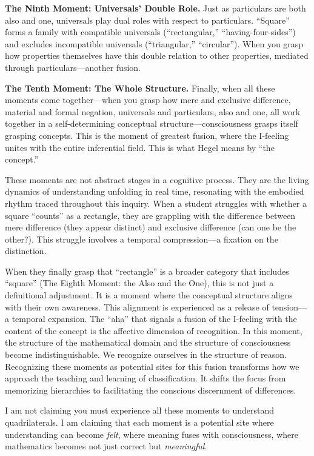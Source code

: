 \documentclass[12pt]{book}
\begin{document}
\textbf{The Ninth Moment: Universals' Double Role.} Just as particulars are both also and one, universals play dual roles with respect to particulars. ``Square'' forms a family with compatible universals (``rectangular,'' ``having-four-sides'') and excludes incompatible universals (``triangular,'' ``circular''). When you grasp how properties themselves have this double relation to other properties, mediated through particulars---another fusion.

\textbf{The Tenth Moment: The Whole Structure.} Finally, when all these moments come together---when you grasp how mere and exclusive difference, material and formal negation, universals and particulars, also and one, all work together in a self-determining conceptual structure---consciousness grasps itself grasping concepts. This is the moment of greatest fusion, where the I-feeling unites with the entire inferential field. This is what Hegel means by ``the concept.''

These moments are not abstract stages in a cognitive process. They are the living dynamics of understanding unfolding in real time, resonating with the embodied rhythm traced throughout this inquiry. When a student struggles with whether a square ``counts'' as a rectangle, they are grappling with the difference between mere difference (they appear distinct) and exclusive difference (can one be the other?). This struggle involves a temporal compression---a fixation on the distinction.

When they finally grasp that ``rectangle'' is a broader category that includes ``square'' (The Eighth Moment: the Also and the One), this is not just a definitional adjustment. It is a moment where the conceptual structure aligns with their own awareness. This alignment is experienced as a release of tension---a temporal expansion. The ``aha'' that signals a fusion of the I-feeling with the content of the concept is the affective dimension of recognition. In this moment, the structure of the mathematical domain and the structure of consciousness become indistinguishable. We recognize ourselves in the structure of reason. Recognizing these moments as potential sites for this fusion transforms how we approach the teaching and learning of classification. It shifts the focus from memorizing hierarchies to facilitating the conscious discernment of differences.

I am not claiming you must experience all these moments to understand quadrilaterals. I am claiming that each moment is a potential site where understanding can become \emph{felt}, where meaning fuses with consciousness, where mathematics becomes not just correct but \emph{meaningful}.
\end{document}
